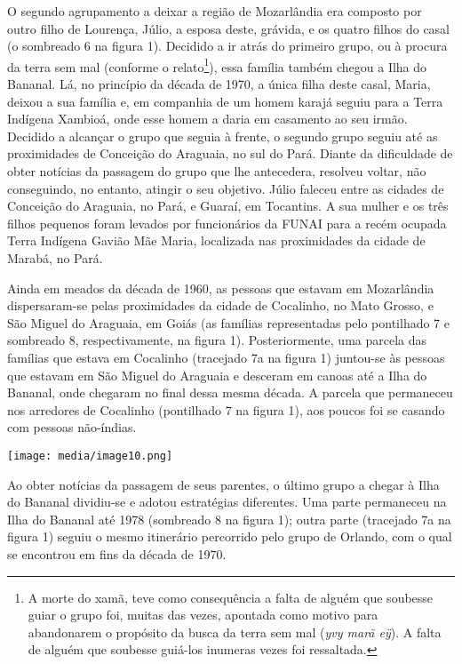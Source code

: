 O segundo agrupamento a deixar a região de Mozarlândia era composto por
outro filho de Lourença, Júlio, a esposa deste, grávida, e os quatro
filhos do casal (o sombreado 6 na figura 1). Decidido a ir atrás do
primeiro grupo, ou à procura da terra sem mal (conforme o
relato\footnote{A morte do xamã, teve como consequência a falta de
  alguém que soubesse guiar o grupo foi, muitas das vezes, apontada como
  motivo para abandonarem o propósito da busca da terra sem mal
  (\emph{yvy marã eÿ}). A falta de alguém que soubesse guiá-los inumeras
  vezes foi ressaltada.}), essa família também chegou a Ilha do Bananal.
Lá, no princípio da década de 1970, a única filha deste casal, Maria,
deixou a sua família e, em companhia de um homem karajá seguiu para a
Terra Indígena Xambioá, onde esse homem a daria em casamento ao seu
irmão. Decidido a alcançar o grupo que seguia à frente, o segundo grupo
seguiu até as proximidades de Conceição do Araguaia, no sul do Pará.
Diante da dificuldade de obter notícias da passagem do grupo que lhe
antecedera, resolveu voltar, não conseguindo, no entanto, atingir o seu
objetivo. Júlio faleceu entre as cidades de Conceição do Araguaia, no
Pará, e Guaraí, em Tocantins. A sua mulher e os três filhos pequenos
foram levados por funcionários da FUNAI para a recém ocupada Terra
Indígena Gavião Mãe Maria, localizada nas proximidades da cidade de
Marabá, no Pará.

Ainda em meados da década de 1960, as pessoas que estavam em Mozarlândia
dispersaram-se pelas proximidades da cidade de Cocalinho, no Mato
Grosso, e São Miguel do Araguaia, em Goiás (as famílias representadas
pelo pontilhado 7 e sombreado 8, respectivamente, na figura 1).
Posteriormente, uma parcela das famílias que estava em Cocalinho
(tracejado 7a na figura 1) juntou-se às pessoas que estavam em São
Miguel do Araguaia e desceram em canoas até a Ilha do Bananal, onde
chegaram no final dessa mesma década. A parcela que permaneceu nos
arredores de Cocalinho (pontilhado 7 na figura 1), aos poucos foi se
casando com pessoas não-índias.

\texttt{[image: media/image10.png]}

Ao obter notícias da passagem de seus parentes, o último grupo a chegar
à Ilha do Bananal dividiu-se e adotou estratégias diferentes. Uma parte
permaneceu na Ilha do Bananal até 1978 (sombreado 8 na figura 1); outra
parte (tracejado 7a na figura 1) seguiu o mesmo itinerário percorrido
pelo grupo de Orlando, com o qual se encontrou em fins da década de
1970.

